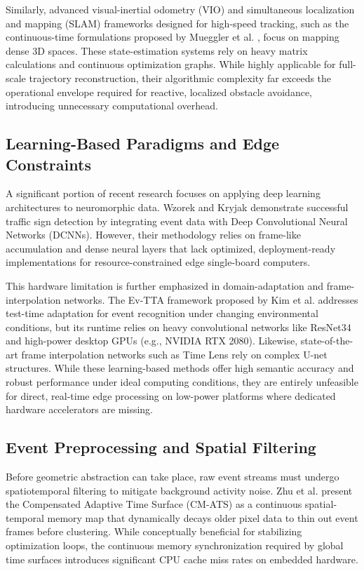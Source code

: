 \documentclass[conference]{IEEEtran}
\begin{document}
Similarly, advanced visual-inertial odometry (VIO) and simultaneous localization and mapping (SLAM) frameworks designed for high-speed tracking, such as the continuous-time formulations proposed by Mueggler et al. \cite{b4, b10}, focus on mapping dense 3D spaces. These state-estimation systems rely on heavy matrix calculations and continuous optimization graphs. While highly applicable for full-scale trajectory reconstruction, their algorithmic complexity far exceeds the operational envelope required for reactive, localized obstacle avoidance, introducing unnecessary computational overhead.

\subsection{Learning-Based Paradigms and Edge Constraints}
A significant portion of recent research focuses on applying deep learning architectures to neuromorphic data. Wzorek and Kryjak \cite{b5} demonstrate successful traffic sign detection by integrating event data with Deep Convolutional Neural Networks (DCNNs). However, their methodology relies on frame-like accumulation and dense neural layers that lack optimized, deployment-ready implementations for resource-constrained edge single-board computers. 

This hardware limitation is further emphasized in domain-adaptation and frame-interpolation networks. The Ev-TTA framework proposed by Kim et al. \cite{b11} addresses test-time adaptation for event recognition under changing environmental conditions, but its runtime relies on heavy convolutional networks like ResNet34 and high-power desktop GPUs (e.g., NVIDIA RTX 2080). Likewise, state-of-the-art frame interpolation networks such as Time Lens \cite{b12} rely on complex U-net structures. While these learning-based methods offer high semantic accuracy and robust performance under ideal computing conditions, they are entirely unfeasible for direct, real-time edge processing on low-power platforms where dedicated hardware accelerators are missing.

\subsection{Event Preprocessing and Spatial Filtering}
Before geometric abstraction can take place, raw event streams must undergo spatiotemporal filtering to mitigate background activity noise. Zhu et al. \cite{b9} present the Compensated Adaptive Time Surface (CM-ATS) as a continuous spatial-temporal memory map that dynamically decays older pixel data to thin out event frames before clustering. While conceptually beneficial for stabilizing optimization loops, the continuous memory synchronization required by global time surfaces introduces significant CPU cache miss rates on embedded hardware. 
\end{document}
